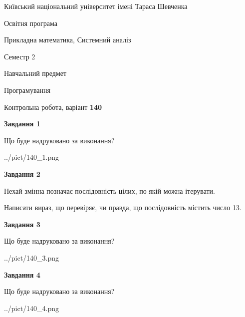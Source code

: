\documentclass[12pt, ukrainian]{article}
\begin{document}
{{\begin {small}\par
{ \center  Київський національний університет імені Тараса Шевченка \par}
{\parbox {5 cm}{Освітня програма \hfill}{\parbox {8 cm}{Прикладна математика, Системний аналіз \hfill}}\parbox {5 cm}{\hfill Семестр 2}}\par
{\parbox {5 cm} {Навчальний предмет \hfill}\parbox {7 cm}{Програмування \hfill}\parbox {6cm}{\hfill}\par}\vspace{-7pt} \end{small}}{\center Контрольна робота, варіант  \No \textbf
{ 140 }\par}}
{
\begin {large}
{\begin {center}\textbf{Завдання 1}\end {center}}\par
Що буде надруковано за виконання?\par\par
\begin{center}
	{../pict/140_1.png}
\end{center}
\newpage

{\begin {center}\textbf{Завдання 2}\end {center}}\par
Нехай змінна  позначає послідовність цілих, по якій можна ітерувати.

Написати вираз, що перевіряє, чи правда, що послідовність  містить число 13.\par
\newpage

{\begin {center}\textbf{Завдання 3}\end {center}}\par
Що буде надруковано за виконання?
\begin{center}
	{../pict/140_3.png}
\end{center}
\newpage

{\begin {center}\textbf{Завдання 4}\end {center}}\par
Що буде надруковано за виконання?\par
\begin{center}
	{../pict/140_4.png}
\end{center}
\newpage


\end{large}}
\end{document}
